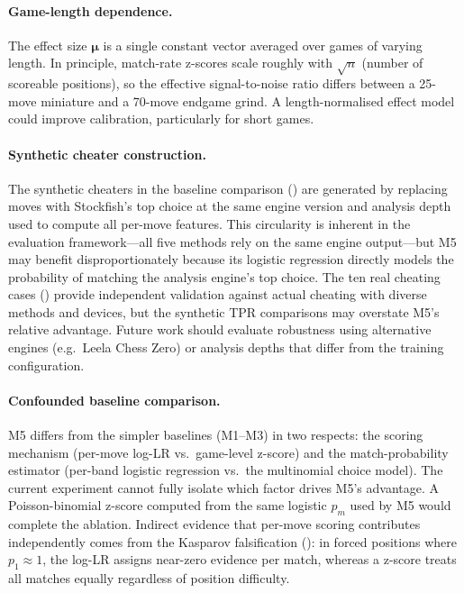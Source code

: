 \documentclass[11pt,a4paper]{article}
\newcommand{\bmu}{\boldsymbol{\mu}}
\theoremstyle{definition}
\begin{document}
\paragraph{Game-length dependence.}
The effect size $\bmu$ is a single constant vector averaged over games
of varying length.  In principle, match-rate z-scores scale roughly
with $\sqrt{n}$ (number of scoreable positions), so the effective
signal-to-noise ratio differs between a 25-move miniature and a
70-move endgame grind.  A length-normalised effect model could improve
calibration, particularly for short games.

\paragraph{Synthetic cheater construction.}
The synthetic cheaters in the baseline comparison
() are generated by replacing moves with
Stockfish's top choice at the same engine version and analysis depth
used to compute all per-move features.  This circularity is inherent
in the evaluation framework---all five methods rely on the same engine
output---but M5 may benefit disproportionately because its logistic
regression directly models the probability of matching the analysis
engine's top choice.  The ten real cheating cases
() provide independent validation against actual
cheating with diverse methods and devices, but the synthetic TPR
comparisons may overstate M5's relative advantage.  Future work should
evaluate robustness using alternative engines (e.g.\ Leela Chess Zero)
or analysis depths that differ from the training configuration.

\paragraph{Confounded baseline comparison.}
M5 differs from the simpler baselines (M1--M3) in two respects:
the scoring mechanism (per-move log-LR vs.\ game-level z-score) and
the match-probability estimator (per-band logistic regression vs.\ the
multinomial choice model).  The current experiment cannot fully isolate
which factor drives M5's advantage.  A Poisson-binomial z-score
computed from the same logistic $p_m$ used by M5 would complete the
ablation.  Indirect evidence that per-move scoring contributes
independently comes from the Kasparov falsification
(): in forced positions where
$p_1 \approx 1$, the log-LR assigns near-zero evidence per match,
whereas a z-score treats all matches equally regardless of position
difficulty.
\end{document}

